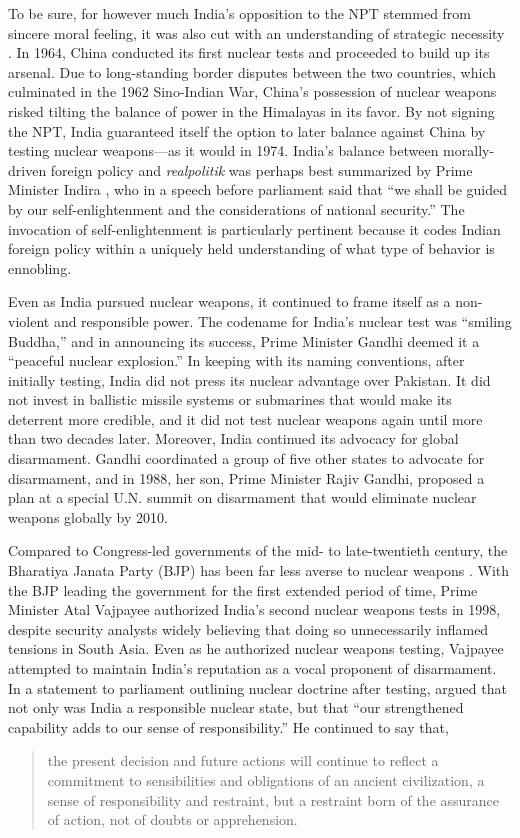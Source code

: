 \documentclass[12pt]{article}
\begin{document}
To be sure, for however much India's opposition to the NPT stemmed from sincere moral feeling, it was also cut with an understanding of strategic necessity \citep{perkovich_indias_2001}. In 1964, China conducted its first nuclear tests and proceeded to build up its arsenal. Due to long-standing border disputes between the two countries, which culminated in the 1962 Sino-Indian War, China's possession of nuclear weapons risked tilting the balance of power in the Himalayas in its favor. By not signing the NPT, India guaranteed itself the option to later balance against China by testing nuclear weapons—as it would in 1974. India's balance between morally-driven foreign policy and \textit{realpolitik} was perhaps best summarized by Prime Minister Indira \citet{gandhi_statement_1968}, who in a speech before parliament said that “we shall be guided by our self-enlightenment and the considerations of national security.” The invocation of self-enlightenment is particularly pertinent because it codes Indian foreign policy within a uniquely held understanding of what type of behavior is ennobling. 

Even as India pursued nuclear weapons, it continued to frame itself as a non-violent and responsible power. The codename for India's nuclear test was “smiling Buddha,” and in announcing its success, Prime Minister Gandhi deemed it a “peaceful nuclear explosion.” In keeping with its naming conventions, after initially testing, India did not press its nuclear advantage over Pakistan. It did not invest in ballistic missile systems or submarines that would make its deterrent more credible, and it did not test nuclear weapons again until more than two decades later. Moreover, India continued its advocacy for global disarmament. Gandhi coordinated a group of five other states to advocate for disarmament, and in 1988, her son, Prime Minister Rajiv Gandhi, proposed a plan at a special U.N. summit on disarmament that would eliminate nuclear weapons globally by 2010. 

Compared to Congress-led governments of the mid- to late-twentieth century, the Bharatiya Janata Party (BJP) has been far less averse to nuclear weapons \citep{hymans_psychology_2006}. With the BJP leading the government for the first extended period of time, Prime Minister Atal Vajpayee authorized India's second nuclear weapons tests in 1998, despite security analysts widely believing that doing so unnecessarily inflamed tensions in South Asia. Even as he authorized nuclear weapons testing, Vajpayee attempted to maintain India's reputation as a vocal proponent of disarmament. In a statement to parliament outlining nuclear doctrine after testing, \citet{vajpayee_evolution_1998} argued that not only was India a responsible nuclear state, but that “our strengthened capability adds to our sense of responsibility.” He continued to say that, \blockquote{the present decision and future actions will  continue to reflect a commitment to sensibilities and  obligations of an ancient civilization, a sense of responsibility and restraint, but a restraint born of the assurance of action, not of doubts or apprehension.}
\end{document}
